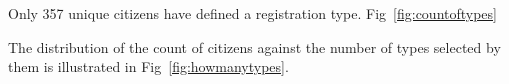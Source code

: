 \documentclass[12pt]{article}
\begin{document}
Only 357 unique citizens have defined a registration type. 
Fig~\ref{fig:countoftypes}

The distribution of the count of citizens against the number of types selected by them is illustrated in Fig~\ref{fig:howmanytypes}.


\end{document}
